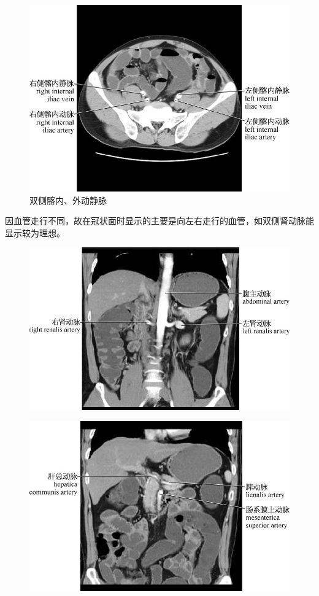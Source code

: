 \begin{figure}[!htbp]
 \centering
 \includegraphics{./images/Image00195.jpg}
 \captionsetup{justification=centering}
 \caption{双侧髂内、外动静脉}
  \end{figure} 
 \FloatBarrier

因血管走行不同，故在冠状面时显示的主要是向左右走行的血管，如双侧肾动脉能显示较为理想。
\begin{figure}[!htbp]
 \centering
 \includegraphics{./images/Image00196.jpg}
  \end{figure} 
 \FloatBarrier

\begin{figure}[!htbp]
 \centering
 \includegraphics{./images/Image00197.jpg}
  \end{figure} 
 \FloatBarrier




